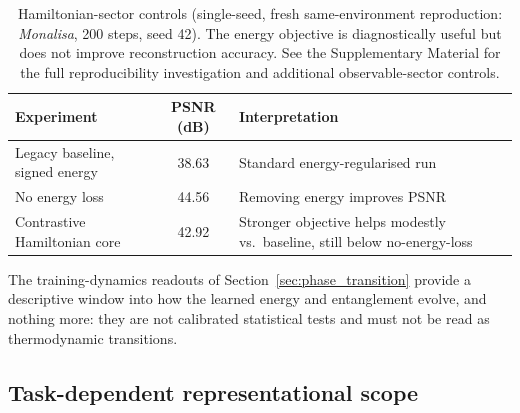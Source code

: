 \documentclass[pdflatex,sn-basic]{sn-jnl}
\begin{document}
\begin{table}[t]
  \centering
  \caption{Hamiltonian-sector controls (single-seed, fresh same-environment
           reproduction: \textit{Monalisa}, 200 steps, seed 42). The energy
           objective is diagnostically useful but does not improve reconstruction
           accuracy. See the Supplementary Material for the full reproducibility
           investigation and additional observable-sector controls.}
  \label{tab:hamiltonian_controls}
  \begin{tabularx}{\textwidth}{@{}L{0.30\textwidth} c Y@{}}
    \toprule
    Experiment                      & PSNR (dB) & Interpretation \\
    \midrule
    Legacy baseline, signed energy  & 38.63     & Standard energy-regularised run \\
    No energy loss                  & 44.56     & Removing energy improves PSNR \\
    Contrastive Hamiltonian core    & 42.92     & Stronger objective helps modestly
                                                  vs.\ baseline, still below
                                                  no-energy-loss \\
    \bottomrule
  \end{tabularx}
\end{table}

The training-dynamics readouts of Section~\ref{sec:phase_transition} provide a
descriptive window into how the learned energy and entanglement evolve, and
nothing more: they are not calibrated statistical tests and must not be read as
thermodynamic transitions.

\subsection{Task-dependent representational scope}
\label{sec:dequant}
\label{sec:representativeness}
\end{document}
